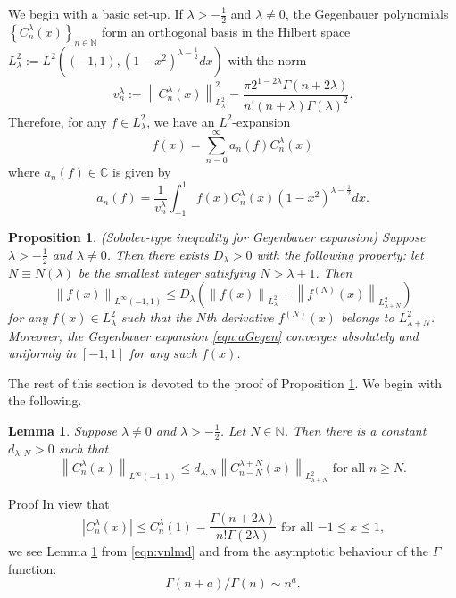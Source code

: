 \documentclass[12pt]{article}
\newcommand{\myabs}[1]{\left|#1\right|}
\newcommand{\N}{\mathbb{N}}
\newcommand{\C}{\mathbb{C}}
\numberwithin{equation}{section}
\newcommand{\mynorm}[1]{\left\|#1\right\|}
\newcommand{\assign}{:=}
\newenvironment{proof*}[1]{\noindent{\textit{#1.\ }}}{\hspace*{\fill}$\Box$\medskip}
\newtheorem{lemma}[corollary]{Lemma}
\newtheorem{proposition}[corollary]{Proposition}
{\theorembodyfont{\rmfamily}\newtheorem{remark}[corollary]{Remark}}
\newcommand{\mygrammarfootnote}[1]{}
\begin{document}
We begin with a basic {set-up}.
If $\lambda>-\frac{1}{2}$ and $\lambda\neq0$, the Gegenbauer polynomials $\left\{ C_n^\lambda(x) \right\}_{n\in\N}$
form an orthogonal basis in the Hilbert space $L_\lambda^2:=L^2\left( (-1,1),(1-x^2)^{\lambda-\frac{1}{2}}dx \right)$
with the norm\begin{equation}
	\label{eqn:vnlmd}
	v_n^\lambda\assign\left\|C_n^\lambda(x)\right\|^2_{L^2_\lambda}=\frac{\pi2^{1-2\lambda}\Gamma(n+2\lambda)}{n!(n+\lambda)\Gamma(\lambda)^2}.
\end{equation}Therefore, for any $f\in L_\lambda^2$, we have an $L^2$-expansion\begin{equation}
	\label{eqn:aGegen}
	f(x)=\displaystyle\sum_{n=0}^\infty a_n(f)C_n^\lambda(x)
\end{equation}where $a_n(f)\in\C$ is\mygrammarfootnote{are?} given by
\begin{equation*}
	a_n(f)=\frac{1}{v_n^\lambda}\displaystyle\int_{-1}^1f(x)C_n^\lambda(x)(1-x^2)^{\lambda-\frac{1}{2}}dx.
\end{equation*}
\begin{proposition}
	\label{prop:1718105}(Sobolev-type inequality for Gegenbauer expansion)
	Suppose $\lambda>-\frac{1}{2}$ and $\lambda\neq0$. Then there exists $D_\lambda>0$ with the following property:
	let $N\equiv N(\lambda)$ be the smallest integer satisfying $N>\lambda+1$. Then
	\begin{equation*}
		\mynorm{f(x)}_{L^\infty(-1,1)}\le D_\lambda\left( \mynorm{f(x)}_{L^2_\lambda}+\mynorm{f^{(N)}(x)}_{L^2_{\lambda+N}} \right)	
	\end{equation*}
	for any $f(x)\in L_\lambda^2$ such that the $N$th derivative $f^{(N)}(x)$ belongs to $L^2_{\lambda+N}$. Moreover, the Gegenbauer expansion
	\eqref{eqn:aGegen} converges absolutely and uniformly in $[-1,1]$ for any such $f(x)$.
\end{proposition}
The rest of this section is devoted to the proof of Proposition \ref{prop:1718105}. We begin with the following.
\begin{lemma}
	Suppose $\lambda\neq0$ and $\lambda>-\frac{1}{2}$. Let $N\in\N$. Then there is a constant $d_{\lambda,N}>0$ such that \begin{equation*}
		\mynorm{C_n^\lambda(x)}_{L^\infty(-1,1)}\le d_{\lambda,N}\mynorm{C^{\lambda+N}_{n-N}(x)}_{L^2_{\lambda+N}}\mbox{ for all $n\ge N$.}
	\end{equation*}
	\label{lem:1718109}
\end{lemma}
\begin{proof*}{Proof}
	In view that\begin{equation*}
		\myabs{C_n^\lambda(x)}\le C_n^\lambda(1)=\frac{\Gamma(n+2\lambda)}{n!\Gamma(2\lambda)}\mbox{ for all $-1\le x\le 1$,}
	\end{equation*}we see Lemma \ref{lem:1718109} from \eqref{eqn:vnlmd} and from the asymptotic behaviour of the $\Gamma$ function:\begin{equation*}
		\Gamma(n+a)/\Gamma(n)\sim n^a.
	\end{equation*}
\end{proof*}
\end{document}
